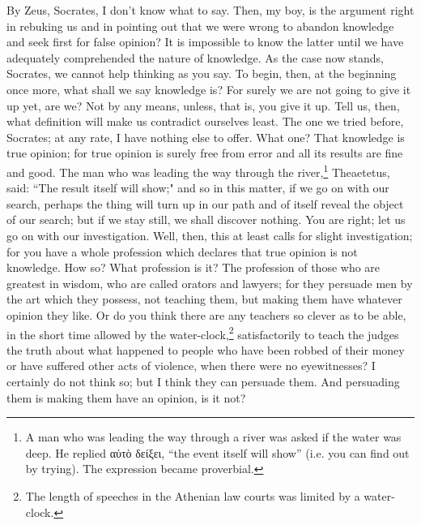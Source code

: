 \documentclass[letterpaper,12pt]{article}
\newcommand{\textgreek}[1]{\begingroup\fontencoding{LGR}\selectfont#1\endgroup}
\newcommand{\stephpag}[1]{\marginnote{\small\itshape\fontfamily{ppl}\selectfont #1}}
\begin{document}
\begin{drama}
\theaetetusspeaks
By Zeus, Socrates, I don't know what to say.
\socratesspeaks
Then, my boy, is the argument right in rebuking us and in pointing out that we were wrong to abandon knowledge and seek first for false opinion? \stephpag{d} It is impossible to know the latter until we have adequately comprehended the nature of knowledge.
\theaetetusspeaks
As the case now stands, Socrates, we cannot help thinking as you say.
\socratesspeaks
To begin, then, at the beginning once more, what shall we say knowledge is? For surely we are not going to give it up yet, are we?
\theaetetusspeaks
Not by any means, unless, that is, you give it up.
\socratesspeaks
Tell us, then, what definition will make us contradict ourselves least. \stephpag{e}
\theaetetusspeaks
The one we tried before, Socrates; at any rate, I have nothing else to offer.
\socratesspeaks
What one?
\theaetetusspeaks
That knowledge is true opinion; for true opinion is surely free from error and all its results are fine and good.
\socratesspeaks
The man who was leading the way through the river,\footnote{A man who was leading the way through a river was asked if the water was deep. He replied \textgreek{αὐτὸ δείξει}, ``the event itself will show'' (i.e. you can find out by trying). The expression became proverbial.} Theaetetus, said: ``The result itself will show;" and so in this matter, if we go on with our search, perhaps the thing will turn up in our path and of itself reveal the object of our search; \stephpag{201 a} but if we stay still, we shall discover nothing.
\theaetetusspeaks
You are right; let us go on with our investigation.
\socratesspeaks
Well, then, this at least calls for slight investigation; for you have a whole profession which declares that true opinion is not knowledge.
\theaetetusspeaks
How so? What profession is it?
\socratesspeaks
The profession of those who are greatest in wisdom, who are called orators and lawyers; for they persuade men by the art which they possess, not teaching them, but making them have whatever opinion they like. Or do you think there are any teachers so clever as to be able, in the short time allowed by the water-clock,\footnote{The length of speeches in the Athenian law courts was limited by a water-clock.} \stephpag{b} satisfactorily to teach the judges the truth about what happened to people who have been robbed of their money or have suffered other acts of violence, when there were no eyewitnesses?
\theaetetusspeaks
I certainly do not think so; but I think they can persuade them.
\socratesspeaks
And persuading them is making them have an opinion, is it not?

\end{drama}
\end{document}
